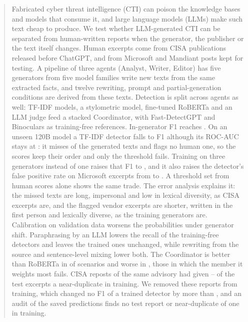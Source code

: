 \documentclass[journal]{IEEEtran}
\begin{document}
\begin{abstract}
Fabricated cyber threat intelligence (CTI) can poison the knowledge bases and models that consume it, and large
language models (LLMs) make such text cheap to produce. We test whether LLM-generated CTI can be separated from
human-written reports when the generator, the publisher or the text itself changes. Human excerpts come from CISA
publications released before ChatGPT, and from Microsoft and Mandiant posts kept for testing. A pipeline of three
agents (Analyst, Writer, Editor) has five generators from five model families write new texts from the same extracted
facts, and twelve rewriting, prompt and partial-generation conditions are derived from these texts. Detection is
split across agents as well: TF-IDF models, a stylometric model, fine-tuned RoBERTa and an LLM judge feed a stacked
Coordinator, with Fast-DetectGPT and Binoculars as training-free references. In-generator F1 reaches
\FoneInCoord{}. On an unseen 120B model a TF-IDF detector falls to F1 \FoneDLexLR{} although its ROC-AUC stays at
\AucDLexLR{}: it misses \NgDLexlrFnr{} of the generated texts and flags no human one, so the scores keep their
order and only the threshold fails. Training on three generators instead of one raises that F1 to \PoolDLexLR{}, and it also raises the
detector's false positive rate on Microsoft excerpts from \PoolfprOneMicrosoftLexlr{} to \PoolfprThreeMicrosoftLexlr{}. A
threshold set from human scores alone shows the same trade. The error analysis explains it: the missed texts are
long, impersonal and low in lexical diversity, as CISA excerpts are, and the flagged vendor excerpts are shorter,
written in the first person and lexically diverse, as the training generators are. Calibration on validation data
worsens the probabilities under generator shift. Paraphrasing by an LLM lowers the recall of the training-free
detectors and leaves the trained ones unchanged, while rewriting from the source and sentence-level mixing lower
both. The Coordinator is better than RoBERTa in \GapWins{} of \GapN{} scenarios and worse in \GapLosses{}, those in
which the member it weights most fails. CISA reposts of the same advisory had given
\LeakPlainDupShareMin{}--\LeakPlainDupShareMax{} of the test excerpts a near-duplicate in training. We removed these
reports from training, which changed no F1 of a trained detector by more than \LeakMaxDeltaPurgeFOne{}, and an audit
of the saved predictions finds no test report or near-duplicate of one in training.
\end{abstract}
\end{document}
